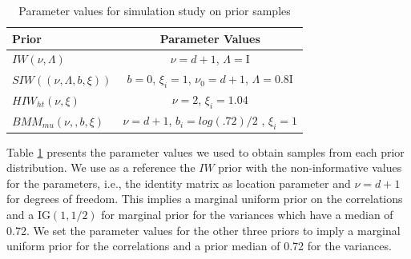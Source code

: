 \documentclass[a4paper]{article}
\newcommand{\I}{\mathrm{I}}
\begin{document}
\begin{table}[htbp]
   \centering
    \caption{ Parameter values for simulation study on prior samples}
   \label{paramvals} 
   \begin{tabular}{ l|c}
   \hline
      Prior    &  Parameter Values \\ \hline
  $IW(\nu, \Lambda)$ &   $\nu=d+1$, $\Lambda=\I$ \\ 
  $SIW((\nu, \Lambda, b, \xi))$  & $b=0$, $\xi_i =1$,  $\nu_0= d + 1$, $\Lambda = 0.8\I$ \\
  $HIW_{ht}(\nu, \xi)$    &  $\nu=2$,  $\xi_i=1.04$ \\
   $BMM_{mu}(\nu,,b,\xi)$   &  $\nu=d+1$, $b_i=log(.72)/2$ , $\xi_i=1$ \\ \hline
   \end{tabular}
 \end{table}       

Table \ref{paramvals} presents the parameter values we used to obtain samples from each prior distribution. We use as a reference the $IW$ prior with the non-informative values for the parameters, i.e., the identity matrix as location parameter and $\nu=d+1$ for degrees of freedom. This implies a marginal uniform prior on the correlations and a IG$(1,1/2)$ for marginal prior for the variances which have a median of 0.72.  We set the parameter values for the other three priors to imply a marginal uniform prior for the correlations and a prior median of 0.72 for the variances. 
\end{document}
